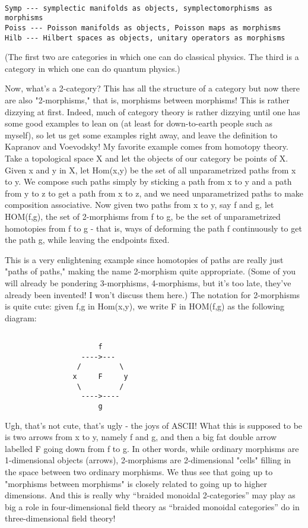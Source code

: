 \begin{verbatim}

Symp --- symplectic manifolds as objects, symplectomorphisms as morphisms
Poiss --- Poisson manifolds as objects, Poisson maps as morphisms
Hilb --- Hilbert spaces as objects, unitary operators as morphisms
\end{verbatim}
    

(The first two are categories in which one can do classical physics.
The third is a category in which one can do quantum physics.)

Now, what's a 2-category?  This has all the structure of a category but
now there are also "2-morphisms," that is, morphisms between morphisms!
This is rather dizzying at first.  Indeed, much of category theory is
rather dizzying until one has some good examples to lean on (at least
for down-to-earth people such as myself), so let us get some examples
right away, and leave the definition to Kapranov and Voevodsky!   My
favorite example comes from homotopy theory.  Take a topological space X
and let the objects of our category be points of X.  Given x and y in X,
let Hom(x,y) be the set of all unparametrized paths from x to y.  We
compose such paths simply by sticking a path from x to y and a path from
y to z to get a path from x to z, and we need unparametrized paths to
make composition associative. Now given two paths from x to y, say f and
g, let HOM(f,g), the set of  2-morphisms from f to g, be the set of
unparametrized homotopies from f to g - that is, ways of deforming the
path f continuously to get the path g, while leaving the endpoints fixed.  

This is a very enlightening example since homotopies of paths are really
just "paths of paths," making the name 2-morphism quite appropriate.
(Some of you will already be pondering 3-morphisms, 4-morphisms, but it's
too late, they've already been invented!  I won't discuss them here.)
The notation for 2-morphisms is quite cute: given f,g in Hom(x,y), we
write F in HOM(f,g) as the following diagram:


\begin{verbatim}

                      f
                  ---->---
                 /         \
                x     F     y
                 \         /
                  ---->----
                      g
\end{verbatim}
    

Ugh, that's not cute, that's ugly - the joys of ASCII!  What this is
supposed to be is two arrows from x to y, namely f and g, and then
a big fat double arrow labelled F going down from f to g.  In other
words, while ordinary morphisms are 1-dimensional objects (arrows),
2-morphisms are 2-dimensional "cells" filling in the space between two 
ordinary morphisms.  We thus see that going up to "morphisms between
morphisms" is closely related to going up to higher dimensions.  And
this is really why ``braided monoidal 2-categories'' may play as big a
role in four-dimensional field theory as ``braided monoidal categories''
do in three-dimensional field theory!

